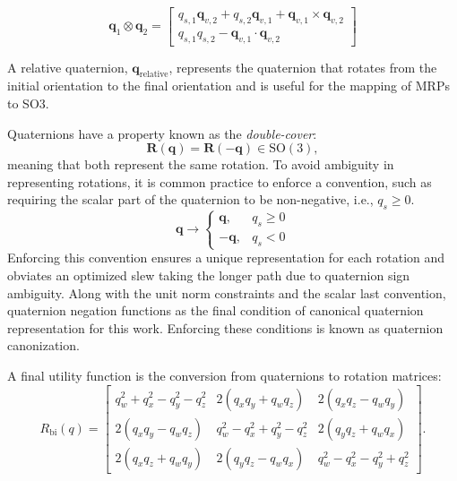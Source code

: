\begin{equation}
\mathbf{q}_1 \otimes \mathbf{q}_2 =
\begin{bmatrix}
    q_{s,1} \mathbf{q}_{v,2} + q_{s,2} \mathbf{q}_{v,1} + \mathbf{q}_{v,1} \times \mathbf{q}_{v,2} \\
    q_{s,1} q_{s,2} - \mathbf{q}_{v,1} \cdot \mathbf{q}_{v,2}
\end{bmatrix}
\label{eq:quaternion-multiplication}
\end{equation}


A relative quaternion, $\mathbf{q}_{\text{relative}}$, represents the quaternion that rotates from the initial orientation to the final orientation and is useful for the mapping of \ac{MRP}s to \ac{SO3}.

Quaternions have a property known as the \emph{double-cover}:
\begin{equation}
\mathbf{R}(\mathbf{q}) = \mathbf{R}(-\mathbf{q}) 
\in \mathrm{SO(3)},
\label{eq:double-cover}
\end{equation}
meaning that both represent the same rotation.
To avoid ambiguity in representing rotations, it is common practice to enforce a convention, such as requiring the scalar part of the quaternion to be non-negative, i.e., \(q_s \geq 0\).
\begin{equation}
    \mathbf{q} \rightarrow 
    \begin{cases}
        \mathbf{q}, & q_s \geq 0 \\
        -\mathbf{q}, & q_s < 0
    \end{cases}
\label{eq:quaternion-negation}
\end{equation}
Enforcing this convention ensures a unique representation for each rotation and obviates an optimized slew taking the longer path due to quaternion sign ambiguity.
Along with the unit norm constraints and the scalar last convention, quaternion negation functions as the final condition of canonical quaternion representation for this work. 
Enforcing these conditions is known as quaternion canonization.

A final utility function is the conversion from quaternions to rotation matrices:
\begin{equation}
R_{\mathrm{bi}}(q) =
\begin{bmatrix}
    q_w^2 + q_x^2 - q_y^2 - q_z^2 & 2(q_xq_y + q_wq_z) & 2(q_xq_z - q_wq_y) \\
    2(q_xq_y - q_wq_z) & q_w^2 - q_x^2 + q_y^2 - q_z^2 & 2(q_yq_z + q_wq_x) \\
    2(q_xq_z + q_wq_y) & 2(q_yq_z - q_wq_x) & q_w^2 - q_x^2 - q_y^2 + q_z^2
\end{bmatrix}.
\label{eq:quat2rot}
\end{equation}


